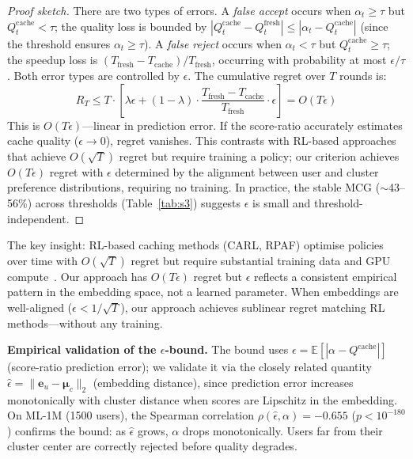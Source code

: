 \documentclass[sigconf,nonacm=false]{acmart}
\begin{document}
\begin{proof}[Proof sketch]
There are two types of errors. A \emph{false accept} occurs when $\alpha_t \geq \tau$ but $Q_t^{\text{cache}} < \tau$; the quality loss is bounded by $|Q_t^{\text{cache}} - Q_t^{\text{fresh}}| \leq |\alpha_t - Q_t^{\text{cache}}|$ (since the threshold ensures $\alpha_t \geq \tau$). A \emph{false reject} occurs when $\alpha_t < \tau$ but $Q_t^{\text{cache}} \geq \tau$; the speedup loss is $(T_{\text{fresh}} - T_{\text{cache}}) / T_{\text{fresh}}$, occurring with probability at most $\epsilon / \tau$. Both error types are controlled by $\epsilon$. The cumulative regret over $T$ rounds is:
\begin{equation}
R_T \leq T \cdot \left[\lambda \epsilon + (1-\lambda) \cdot \frac{T_{\text{fresh}} - T_{\text{cache}}}{T_{\text{fresh}}} \cdot \epsilon\right] = O(T \epsilon)
\label{eq:regret_cumulative}
\end{equation}
This is $O(T\epsilon)$---linear in prediction error. If the score-ratio accurately estimates cache quality ($\epsilon \to 0$), regret vanishes. This contrasts with RL-based approaches~\cite{carl2024, dynamicwidth2025, radar2025} that achieve $O(\sqrt{T})$ regret but require training a policy; our criterion achieves $O(T\epsilon)$ regret with $\epsilon$ determined by the alignment between user and cluster preference distributions, requiring no training. In practice, the stable MCG ($\sim$43--56\%) across thresholds (Table~\ref{tab:s3}) suggests $\epsilon$ is small and threshold-independent.
\end{proof}

The key insight: RL-based caching methods (CARL, RPAF) optimise policies over time with $O(\sqrt{T})$ regret but require substantial training data and GPU compute~\cite{carl2024}. Our approach has $O(T\epsilon)$ regret but $\epsilon$ reflects a consistent empirical pattern in the embedding space, not a learned parameter. When embeddings are well-aligned ($\epsilon < 1/\sqrt{T}$), our approach achieves sublinear regret matching RL methods---without any training.

\textbf{Empirical validation of the $\epsilon$-bound.} The bound uses $\epsilon = \mathbb{E}[|\alpha - Q^{\text{cache}}|]$ (score-ratio prediction error); we validate it via the closely related quantity $\hat{\epsilon} = \|\mathbf{e}_u - \boldsymbol{\mu}_c\|_2$ (embedding distance), since prediction error increases monotonically with cluster distance when scores are Lipschitz in the embedding. On ML-1M (1500 users), the Spearman correlation $\rho(\hat{\epsilon}, \alpha) = -0.655$ ($p<10^{-180}$) confirms the bound: as $\hat{\epsilon}$ grows, $\alpha$ drops monotonically. Users far from their cluster center are correctly rejected before quality degrades.
\end{document}
